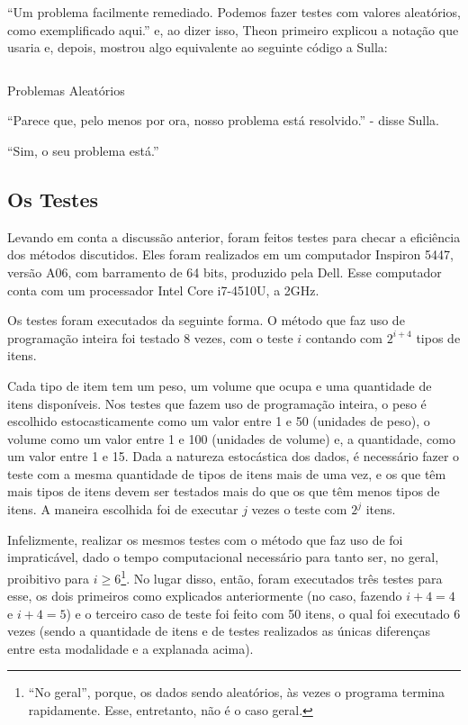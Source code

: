 \documentclass{article}
\begin{document}
``Um problema facilmente remediado. Podemos fazer testes com valores
aleatórios, como exemplificado aqui.'' e, ao dizer isso, Theon
primeiro explicou a notação que usaria e, depois, mostrou algo
equivalente ao seguinte código a Sulla:

\begin{listing}[H]
  \inputminted{prolog}{../Exemplos/Cap12/test/random.ecl}
  \caption{Problemas Aleatórios}\label{lst:random}
\end{listing}

``Parece que, pelo menos por ora, nosso problema está resolvido.'' -
disse Sulla.

``Sim, o seu problema está.''

\subsection{Os Testes}

Levando em conta a discussão anterior, foram feitos testes para
checar a eficiência dos métodos discutidos. Eles foram realizados em
um computador Inspiron 5447, versão A06, com barramento de 64 bits,
produzido pela Dell. Esse computador conta com um processador Intel
Core i7-4510U, a 2GHz.

Os testes foram executados da seguinte forma. O método que faz uso de
programação inteira foi testado 8 vezes, com o teste $i$ contando
com $2^{i+4}$ tipos de itens.

Cada tipo de item tem um peso, um volume que ocupa e uma quantidade
de itens disponíveis. Nos testes que fazem uso de programação
inteira, o peso é escolhido estocasticamente como um valor entre 1 e
50 (unidades de peso), o volume como um valor entre 1 e 100
(unidades de volume) e, a quantidade, como um valor entre 1 e
15. Dada a natureza estocástica dos dados, é necessário fazer o
teste com a mesma quantidade de tipos de itens mais de uma vez, e os
que têm mais tipos de itens devem ser testados mais do que os que
têm menos tipos de itens. A maneira escolhida foi de executar $j$ vezes
o teste com $2^j$ itens.

Infelizmente, realizar os mesmos testes com o método que faz uso de
 foi impraticável, dado o tempo
computacional necessário para tanto ser, no geral, proibitivo para
$i \geq 6$\footnote{``No geral'', porque, os dados sendo aleatórios,
  às vezes o programa termina rapidamente. Esse, entretanto, não é o
  caso geral.}. No lugar disso, então, foram executados três testes
para esse, os dois primeiros como explicados anteriormente (no caso,
fazendo $i + 4 = 4$ e $i + 4 = 5$) e o terceiro caso de teste foi
feito com 50 itens, o qual foi executado 6 vezes (sendo a quantidade de
itens e de testes realizados as únicas diferenças entre esta
modalidade e a explanada acima).
\end{document}
